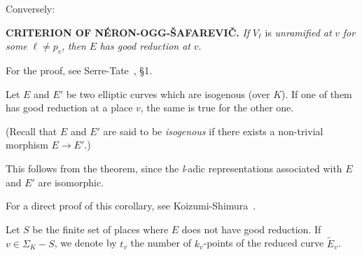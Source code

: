 Conversely:

\medskip
\noindent\textbf{CRITERION OF N\'ERON-OGG-\v{S}AFAREVI\v{C}.}%
\hspace{0.6em}\emph{If} $V_\ell$ is \emph{unramified at} $v$ \emph{for
some} $\ell \neq p_v$, \emph{then} $E$ \emph{has good reduction at}
$v$.
\medskip

For the proof, see Serre-Tate~\cite{serre-tate-good}, \S1.

\begin{corollary}
Let $E$ and $E'$ be two elliptic curves which are isogenous (over $K$).
If one of them has good reduction at a place $v$, the same is true for
the other one.
\end{corollary}

(Recall that $E$ and $E'$ are said to be \emph{isogenous} if there
exists a non-trivial morphism $E \longrightarrow E'$.)

This follows from the theorem, since the \textit{l}-adic
representations associated with $E$ and $E'$ are isomorphic.


For a direct proof of this corollary, see
Koizumi-Shimura~\cite{koizumi-shimura}.


Let $S$ be the finite set of places where $E$ does not have good
reduction.  If $v \in \Sigma_K - S$, we denote by $t_v$ the number of
$k_v$-points of the reduced curve $\widetilde{E}_v$.

